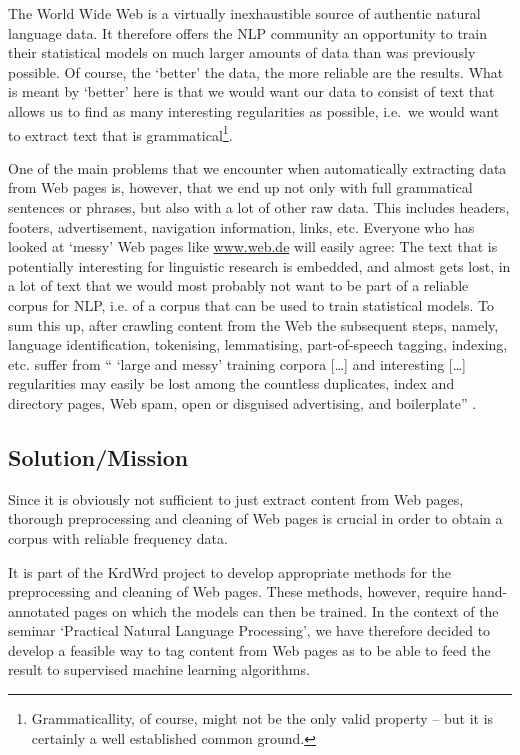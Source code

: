 \documentclass[12pt]{article}
\begin{document}
The World Wide Web is a virtually inexhaustible source of authentic natural language data. It therefore offers the NLP community an opportunity to train their statistical models on much larger amounts of data than was previously possible. Of course, the `better' the data, the more reliable are the results. What is meant by `better' here is that we would want our data to consist of text that allows us to find as many interesting regularities as possible, i.e.~we would want to extract text that is grammatical\footnote{Grammaticallity, of course, might not be the only valid property -- but it is certainly a well established common ground.}.

One of the main problems that we encounter when automatically extracting data from Web pages is, however, that we end up not only with full grammatical sentences or phrases, but also with a lot of other raw data. This includes headers, footers, advertisement, navigation information, links, etc. Everyone who has looked at `messy' Web pages like \url{www.web.de} will easily agree: The text that is potentially interesting for linguistic research is embedded, and almost gets lost, in a lot of text that we would most probably not want to be part of a reliable corpus for NLP, i.e. of a corpus that can be used to train statistical models. To sum this up, after crawling content from the Web the subsequent steps, namely, language identification, tokenising, lemmatising, part-of-speech tagging, indexing, etc. suffer from `` `large and messy' training corpora [\ldots] and interesting [\ldots] regularities may easily be lost among the countless duplicates, index and directory pages, Web spam, open or disguised advertising, and boilerplate'' \cite{Evert2008}.


\subsection{Solution/Mission}

Since it is obviously not sufficient to just extract content from Web pages, thorough preprocessing and cleaning of Web pages is crucial in order to obtain a corpus with reliable frequency data.

It is part of the KrdWrd project to develop appropriate methods for the preprocessing and cleaning of Web pages. These methods, however, require hand-annotated pages on which the models can then be trained. In the context of the seminar `Practical Natural Language Processing', we have therefore decided to develop a feasible way to tag content from Web pages as to be able to feed the result to supervised machine learning algorithms.
\end{document}
